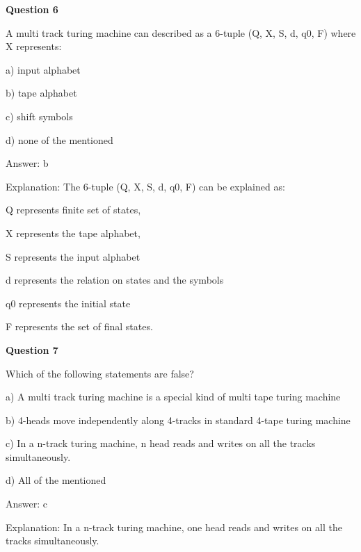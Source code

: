 \documentclass{article}
\begin{document}
\begin{mdframed}[linewidth=1pt, roundcorner=5pt, linecolor=gray!30, backgroundcolor=gray!5]
\textbf{Question 6} 

A multi track turing machine can described as a 6-tuple (Q, X, S, d, q0, F) where X represents:

a) input alphabet

b) tape alphabet

c) shift symbols

d) none of the mentioned
\vspace{5pt} \par
\begin{tcolorbox}[colback=green!5, colframe=green!40!black, title=Solution]
Answer: b

Explanation: The 6-tuple (Q, X, S, d, q0, F)  can be explained as:

Q represents finite set of states,

X represents the tape alphabet,

S represents the input alphabet

d represents the relation on states and the symbols

q0 represents the initial state

F represents the set of final states.
\end{tcolorbox}
\end{mdframed}

\begin{mdframed}[linewidth=1pt, roundcorner=5pt, linecolor=gray!30, backgroundcolor=gray!5]
\textbf{Question 7} 

Which of the following statements are false?

a) A multi track turing machine is a special kind of multi tape turing machine

b) 4-heads move independently along 4-tracks in standard 4-tape turing machine

c) In a n-track turing machine, n head reads and writes on all the tracks simultaneously.

d) All of the mentioned
\vspace{5pt} \par
\begin{tcolorbox}[colback=green!5, colframe=green!40!black, title=Solution]
Answer: c

Explanation: In a n-track turing machine, one head reads and writes on all the tracks simultaneously.
\end{tcolorbox}
\end{mdframed}
\end{document}
